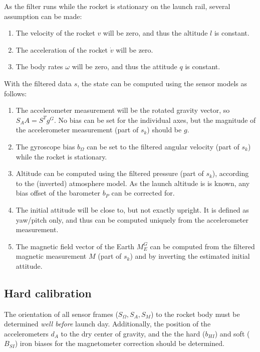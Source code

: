 As the filter runs while the rocket is stationary on the launch rail, several assumption can be made:
\begin{enumerate}
    \item The velocity of the rocket $v$ will be zero, and thus the altitude $l$ is constant.
    \item The acceleration of the rocket $\dot v$ will be zero.
    \item The body rates $\omega$ will be zero, and thus the attitude $q$ is constant.
\end{enumerate}
With the filtered data $s$, the state can be computed using the sensor models as follows:
\begin{enumerate}
    \item The accelerometer measurement will be the rotated gravity vector, so $S_A A = S^T g^G$. 
    No bias can be set for the individual axes, but the magnitude of the accelerometer measurement (part of $s_k$) should be $g$.
    
    \item The gyroscope bias $b_\Omega$ can be set to the filtered angular velocity (part of $s_k$) while the rocket is stationary.
    
    \item Altitude can be computed using the filtered pressure (part of $s_k$), according to the (inverted) atmosphere model.
    As the launch altitude is is known, any bias offset of the barometer $b_P$ can be corrected for. 
    
    \item The initial attitude will be close to, but not exactly upright.
    It is defined as yaw/pitch only, and thus can be computed uniquely from the accelerometer measurement.
    
    \item The magnetic field vector of the Earth $M_E^G$ can be computed from the filtered magnetic measurement $M$ (part of $s_k$) and by inverting the estimated initial attitude.
\end{enumerate}

\subsection{Hard calibration}
\label{sec:hard-calibration}
The orientation of all sensor frames ($S_\Omega, S_A, S_M$) to the rocket body must be determined \textit{well before} launch day.
Additionally, the position of the accelerometers $d_A$ to the dry center of gravity, and the the hard ($b_{HI}$) and soft ($B_{SI}$) iron biases for the magnetometer correction should be determined.
